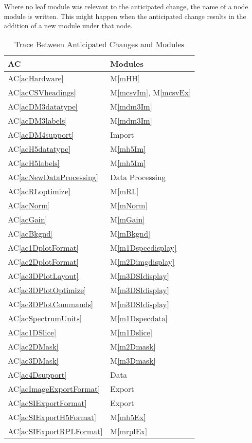 \documentclass[12pt, titlepage]{article}
\newcommand{\acref}[1]{AC\ref{#1}}
\newcommand{\mref}[1]{M\ref{#1}}
\begin{document}
Where no leaf module was relevant to the anticipated change, the name of a node
module is written. This might happen when the anticipated change results in the
addition of a new module under that node.

\begin{table}[H]
\centering
\begin{tabular}{p{} p{}}
	\toprule
	\textbf{AC} & \textbf{Modules}\\
	\midrule
	\acref{acHardware} & \mref{mHH}\\
	\acref{acCSVheadings} & \mref{mcsvIm}, \mref{mcsvEx}\\
	\acref{acDM3datatype} & \mref{mdm3Im}\\
	\acref{acDM3labels} & \mref{mdm3Im}\\
	\acref{acDM4support} & Import\\
	\acref{acH5datatype} & \mref{mh5Im}\\
	\acref{acH5labels} & \mref{mh5Im}\\
	\acref{acNewDataProcessing} & Data Processing\\
	\acref{acRLoptimize} & \mref{mRL}\\
	\acref{acNorm} & \mref{mNorm}\\
	\acref{acGain} & \mref{mGain}\\
	\acref{acBkgnd} & \mref{mBkgnd}\\
	\acref{ac1DplotFormat} & \mref{m1Dspecdisplay}\\
	\acref{ac2DplotFormat} & \mref{m2Dimgdisplay}\\
	\acref{ac3DPlotLayout} & \mref{m3DSIdisplay}\\
	\acref{ac3DPlotOptimize} & \mref{m3DSIdisplay}\\
	\acref{ac3DPlotCommands} & \mref{m3DSIdisplay}\\
	\acref{acSpectrumUnits} & \mref{m1Dspecdata}\\
	\acref{ac1DSlice} & \mref{m1Dslice}\\
	\acref{ac2DMask} & \mref{m2Dmask}\\
	\acref{ac3DMask} & \mref{m3Dmask}\\
	\acref{ac4Dsupport} & Data\\
	\acref{acImageExportFormat} & Export\\
	\acref{acSIExportFormat} & Export\\
	\acref{acSIExportH5Format} & \mref{mh5Ex}\\
	\acref{acSIExportRPLFormat} & \mref{mrplEx}\\
	\bottomrule
\end{tabular}
\caption{Trace Between Anticipated Changes and Modules}
\label{TblACT}
\end{table}
\end{document}
